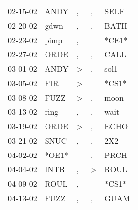 \begin{supertabular}{p{0.07\textwidth}p{0.06\textwidth}p{0.02\textwidth}p{0.02\textwidth}p{0.06\textwidth}}
          02-15-02\textsuperscript{} &           ANDY\textsuperscript{} &                , &                , &           SELF\textsuperscript{} \\
          02-20-02\textsuperscript{} &           gdwn\textsuperscript{} &                , &                , &           BATH\textsuperscript{} \\
          02-23-02\textsuperscript{} &           pimp\textsuperscript{} &                , &                  &                            *CE1* \\
          02-27-02\textsuperscript{} &           ORDE\textsuperscript{} &                , &                , &           CALL\textsuperscript{} \\
          03-01-02\textsuperscript{} &           ANDY\textsuperscript{} &     \textgreater &                , &           sol1\textsuperscript{} \\
          03-05-02\textsuperscript{} &            FIR\textsuperscript{} &     \textgreater &                  &                            *CS1* \\
          03-08-02\textsuperscript{} &           FUZZ\textsuperscript{} &     \textgreater &                , &           moon\textsuperscript{} \\
          03-13-02\textsuperscript{} &           ring\textsuperscript{} &                , &                , &           wait\textsuperscript{} \\
          03-19-02\textsuperscript{} &           ORDE\textsuperscript{} &     \textgreater &                , &           ECHO\textsuperscript{} \\
          03-21-02\textsuperscript{} &           SNUC\textsuperscript{} &                , &                , &            2X2\textsuperscript{} \\
          04-02-02\textsuperscript{} &                            *OE1* &                  &                , &           PRCH\textsuperscript{} \\
          04-04-02\textsuperscript{} &           INTR\textsuperscript{} &                , &     \textgreater &           ROUL\textsuperscript{} \\
          04-09-02\textsuperscript{} &           ROUL\textsuperscript{} &                , &                  &                            *CS1* \\
          04-13-02\textsuperscript{} &           FUZZ\textsuperscript{} &                , &                , &           GUAM\textsuperscript{} \\

\end{supertabular}
